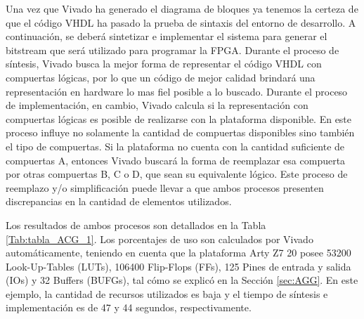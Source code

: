 	Una vez que Vivado ha generado el diagrama de bloques ya tenemos la certeza de que el código VHDL ha pasado la prueba de sintaxis del entorno de desarrollo. A continuación, se deberá sintetizar e implementar el sistema para generar el bitstream que será utilizado para programar la FPGA. Durante el proceso de síntesis, Vivado busca la mejor forma de representar el código VHDL con compuertas lógicas, por lo que un código de mejor calidad brindará una representación en hardware lo mas fiel posible a lo buscado. Durante el proceso de implementación, en cambio, Vivado calcula si la representación con compuertas lógicas es posible de realizarse con la plataforma disponible. En este proceso influye no solamente la cantidad de compuertas disponibles sino también el tipo de compuertas. Si la plataforma no cuenta con la cantidad suficiente de compuertas A, entonces Vivado buscará la forma de reemplazar esa compuerta por otras compuertas B, C o D, que sean su equivalente lógico. Este proceso de reemplazo y/o simplificación puede llevar a que ambos procesos presenten discrepancias en la cantidad de elementos utilizados. 
	
	Los resultados de ambos procesos son detallados en la Tabla \ref{Tab:tabla_ACG_1}. Los porcentajes de uso son calculados por Vivado automáticamente, teniendo en cuenta que la plataforma Arty Z7 20 posee 53200 Look-Up-Tables (LUTs), 106400 Flip-Flops (FFs), 125 Pines de entrada y salida (IOs) y 32 Buffers (BUFGs), tal cómo se explicó en la Sección \ref{sec:AGG}. En este ejemplo, la cantidad de recursos utilizados es baja y el tiempo de síntesis e implementación es de 47 y 44 segundos, respectivamente.
	
	\begin{table}[H]
		{
			\caption{Síntesis e implementación del ejemplo 1 generado por el ACG.}
			\label{Tab:tabla_ACG_1}
			\centering
			\begin{center}
			\end{center}
		}    
	\end{table}
	
	
	